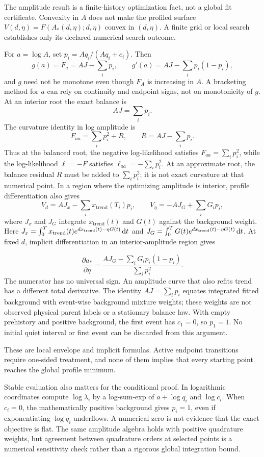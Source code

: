 The amplitude result is a finite-history optimization fact, not a global fit certificate. Convexity in \(A\) does not make the profiled surface \(V(d,\eta)=F(A_*(d,\eta);d,\eta)\) convex in \((d,\eta)\). A finite grid or local search establishes only its declared numerical search outcome.

For \(a=\log A\), set \(p_i=Aq_i/(Aq_i+c_i)\). Then
\[
g(a)=F_a=AJ-\sum_i p_i,
\qquad
g'(a)=AJ-\sum_i p_i(1-p_i),
\]
and \(g\) need not be monotone even though \(F_A\) is increasing in \(A\). A bracketing method for \(a\) can rely on continuity and endpoint signs, not on monotonicity of \(g\). At an interior root the exact balance is
\[
AJ=\sum_i p_i.
\]
The curvature identity in log amplitude is
\[
F_{aa}=\sum_i p_i^2+R,
\qquad
R=AJ-\sum_i p_i.
\]
Thus at the balanced root, the negative log-likelihood satisfies
\(F_{aa}=\sum_i p_i^2\), while the log-likelihood \(\ell=-F\) satisfies
\(\ell_{aa}=-\sum_i p_i^2\). At an approximate root, the balance residual \(R\) must be added to \(\sum_i p_i^2\); it is not exact curvature at that numerical point. In a region where the optimizing amplitude is interior, profile differentiation also gives
\[
V_d=AJ_x-\sum_i x_{\mathrm{trend}}(T_i)p_i,
\qquad
V_\eta=-AJ_G+\sum_i G_ip_i,
\]
where \(J_x\) and \(J_G\) integrate \(x_{\mathrm{trend}}(t)\) and \(G(t)\) against the background weight. Here \(J_x=\int_0^Tx_{\mathrm{trend}}(t)e^{dx_{\mathrm{trend}}(t)-\eta G(t)}\mathop{}\!\mathrm{d} t\) and \(J_G=\int_0^TG(t)e^{dx_{\mathrm{trend}}(t)-\eta G(t)}\mathop{}\!\mathrm{d} t\). At fixed \(d\), implicit differentiation in an interior-amplitude region gives

\[
\frac{\partial a_*}{\partial\eta}
=\frac{AJ_G-\sum_iG_ip_i(1-p_i)}{\sum_i p_i^2}.
\]
The numerator has no universal sign. An amplitude curve that also refits trend has a different total derivative. The identity \(AJ=\sum_i p_i\) equates integrated fitted background with event-wise background mixture weights; these weights are not observed physical parent labels or a stationary balance law. With empty prehistory and positive background, the first event has \(c_1=0\), so \(p_1=1\). No initial quiet interval or first event can be discarded from this argument.

These are local envelope and implicit formulas. Active endpoint transitions require one-sided treatment, and none of them implies that every starting point reaches the global profile minimum.

Stable evaluation also matters for the conditional proof. In logarithmic coordinates compute \(\log\lambda_i\) by a log-sum-exp of \(a+\log q_i\) and \(\log c_i\). When \(c_i=0\), the mathematically positive background gives \(p_i=1\), even if exponentiating \(\log q_i\) underflows. A numerical zero is not evidence that the exact objective is flat. The same amplitude algebra holds with positive quadrature weights, but agreement between quadrature orders at selected points is a numerical sensitivity check rather than a rigorous global integration bound.


